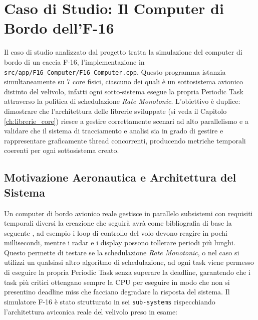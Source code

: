 \chapter{Caso di Studio: Il Computer di Bordo dell'F-16}
\label{ch:f16_computer}
\label{sec:caso_di_studio}
\label{caso_di_studio_FCS}
Il caso di studio analizzato dal progetto tratta la simulazione del computer di bordo di un caccia F-16, l'implementazione in \texttt{src/app/F16\_Computer/F16\_Computer.cpp}. Questo programma istanzia simultaneamente su 7 core fisici, ciascuno dei quali è un sottosistema avionico distinto del velivolo, infatti ogni sotto-sistema esegue la propria Periodic Task attraverso la politica di schedulazione \textit{Rate Monotonic}.
L'obiettivo è duplice: dimostrare che l'architettura delle librerie sviluppate (si veda il Capitolo \ref{ch:librerie_core}) riesce a gestire correttamente scenari ad alto parallelismo e a validare che il sistema di tracciamento e analisi sia in grado di gestire e rappresentare graficamente thread concorrenti, producendo metriche temporali coerenti per ogni sottosistema creato.
 
\clearpage
\section{Motivazione Aeronautica e Architettura del Sistema}
Un computer di bordo avionico reale gestisce in parallelo subsistemi con requisiti temporali diversi la creazione che seguirà avrà come bibliografia di base la seguente 	\cite{Scheduling_Real_Time}, ad esempio i loop di controllo del volo devono reagire in pochi millisecondi, mentre i radar e i display possono tollerare periodi più lunghi. Questo permette di testare se la schedulazione \textit{Rate Monotonic}, o nel caso si utilizzi un qualsiasi altro algoritmo di schedulazione, ad ogni task viene permesso di eseguire la propria Periodic Task senza superare la deadline, garantendo che i task più critici ottengano sempre la CPU per eseguire in modo che non si presentino deadline miss che facciano degradare la risposta del sistema.
Il simulatore F-16 è stato strutturato in sei \texttt{sub-systems} rispecchiando l'architettura aviconica reale del velivolo preso in esame:

